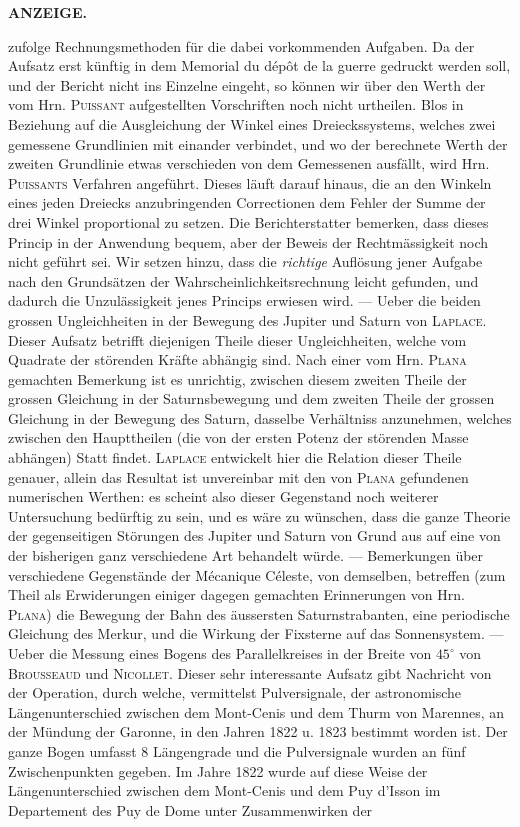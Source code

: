 \noindent{}\parbox[t]{\dimexpr\linewidth-24mm\relax}{\centering\scriptsize\bfseries ANZEIGE.}\makebox[12mm][r]{\large\bfseries }\par\nobreak\medskip\noindent zufolge Rechnungsmethoden für die dabei vorkommenden Aufgaben. Da der Aufsatz erst künftig in dem Memorial du dépôt de la guerre gedruckt werden soll, und der Bericht nicht ins Einzelne eingeht, so können wir über den Werth der vom Hrn. \textsc{Puissant} aufgestellten Vorschriften noch nicht urtheilen. Blos in Beziehung auf die Ausgleichung der Winkel eines Dreieckssystems, welches zwei gemessene Grundlinien mit einander verbindet, und wo der berechnete Werth der zweiten Grundlinie etwas verschieden von dem Gemessenen ausfällt, wird Hrn. \textsc{Puissants} Verfahren angeführt. Dieses läuft darauf hinaus, die an den Winkeln eines jeden Dreiecks anzubringenden Correctionen dem Fehler der Summe der drei Winkel proportional zu setzen. Die Berichterstatter bemerken, dass dieses Princip in der Anwendung bequem, aber der Beweis der Rechtmässigkeit noch nicht geführt sei. Wir setzen hinzu, dass die \emph{richtige} Auflösung jener Aufgabe nach den Grundsätzen der Wahrscheinlichkeitsrechnung leicht gefunden, und dadurch die Unzulässigkeit jenes Princips erwiesen wird. --- Ueber die beiden grossen Ungleichheiten in der Bewegung des Jupiter und Saturn von \textsc{Laplace}. Dieser Aufsatz betrifft diejenigen Theile dieser Ungleichheiten, welche vom Quadrate der störenden Kräfte abhängig sind. Nach einer vom Hrn. \textsc{Plana} gemachten Bemerkung ist es unrichtig, zwischen diesem zweiten Theile der grossen Gleichung in der Saturnsbewegung und dem zweiten Theile der grossen Gleichung in der Bewegung des Saturn, dasselbe Verhältniss anzunehmen, welches zwischen den Haupttheilen (die von der ersten Potenz der störenden Masse abhängen) Statt findet. \textsc{Laplace} entwickelt hier die Relation dieser Theile genauer, allein das Resultat ist unvereinbar mit den von \textsc{Plana} gefundenen numerischen Werthen: es scheint also dieser Gegenstand noch weiterer Untersuchung bedürftig zu sein, und es wäre zu wünschen, dass die ganze Theorie der gegenseitigen Störungen des Jupiter und Saturn von Grund aus auf eine von der bisherigen ganz verschiedene Art behandelt würde. --- Bemerkungen über verschiedene Gegenstände der Mécanique Céleste, von demselben, betreffen (zum Theil als Erwiderungen einiger dagegen gemachten Erinnerungen von Hrn. \textsc{Plana}) die Bewegung der Bahn des äussersten Saturnstrabanten, eine periodische Gleichung des Merkur, und die Wirkung der Fixsterne auf das Sonnensystem. --- Ueber die Messung eines Bogens des Parallelkreises in der Breite von $45^\circ$ von \textsc{Brousseaud} und \textsc{Nicollet}. Dieser sehr interessante Aufsatz gibt Nachricht von der Operation, durch welche, vermittelst Pulversignale, der astronomische Längenunterschied zwischen dem Mont-Cenis und dem Thurm von Marennes, an der Mündung der Garonne, in den Jahren 1822 u. 1823 bestimmt worden ist. Der ganze Bogen umfasst 8 Längengrade und die Pulversignale wurden an fünf Zwischenpunkten gegeben. Im Jahre 1822 wurde auf diese Weise der Längenunterschied zwischen dem Mont-Cenis und dem Puy d'Isson im Departement des Puy de Dome unter Zusammenwirken der 